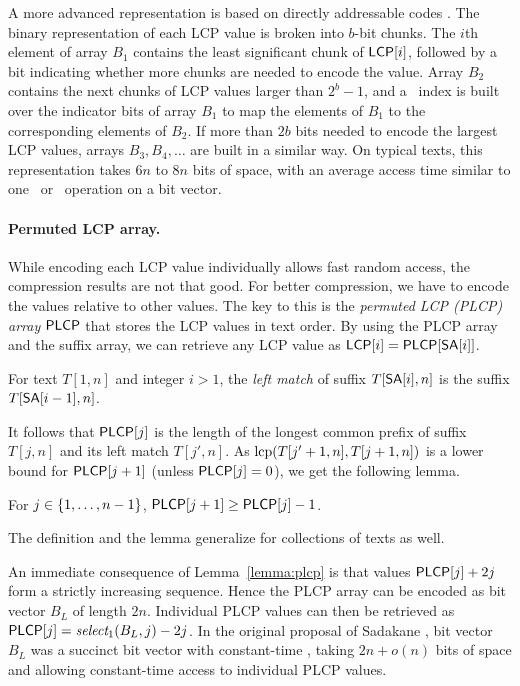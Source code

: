 A more advanced representation \cite{Canovas2010} is based on directly addressable codes \cite{Brisaboa2009}. The binary representation of each LCP value is broken into $b$\nobreakdash-bit chunks. The $i$th element of array $B_{1}$ contains the least significant chunk of $\mathsf{LCP}[i]$, followed by a bit indicating whether more chunks are needed to encode the value. Array $B_{2}$ contains the next chunks of LCP values larger than $2^{b}-1$, and a \rank\ index is built over the indicator bits of array $B_{1}$ to map the elements of $B_{1}$ to the corresponding elements of $B_{2}$. If more than $2b$ bits needed to encode the largest LCP values, arrays $B_{3}, B_{4}, \dotsc$ are built in a similar way. On typical texts, this representation takes $6n$ to $8n$ bits of space, with an average access time similar to one \rank\ or \select\ operation on a bit vector.

\paragraph{Permuted LCP array.}

While encoding each LCP value individually allows fast random access, the compression results are not that good. For better compression, we have to encode the values relative to other values. The key to this is the \emph{permuted LCP (PLCP) array} $\mathsf{PLCP}$ that stores the LCP values in text order. By using the PLCP array and the suffix array, we can retrieve any LCP value as $\mathsf{LCP}[i] = \mathsf{PLCP}[\mathsf{SA}[i]]$.

\begin{definition}\label{def:left match}
For text $T[1,n]$ and integer $i > 1$, the \emph{left match} of suffix $T[\mathsf{SA}[i],n]$ is the suffix $T[\mathsf{SA}[i-1],n]$.
\end{definition}

It follows that $\mathsf{PLCP}[j]$ is the length of the longest common prefix of suffix $T[j,n]$ and its left match $T[j',n]$. As $\operatorname{lcp}(T[j'+1,n], T[j+1,n])$ is a lower bound for $\mathsf{PLCP}[j+1]$ (unless $\mathsf{PLCP}[j] = 0$), we get the following lemma.

\begin{lemma}\label{lemma:plcp}
For $j \in \{ 1, \dotsc, n-1 \}$, $\mathsf{PLCP}[j+1] \ge \mathsf{PLCP}[j] - 1$.
\end{lemma}

The definition and the lemma generalize for collections of texts as well.

An immediate consequence of Lemma~\ref{lemma:plcp} is that values $\mathsf{PLCP}[j] + 2j$ form a strictly increasing sequence. Hence the PLCP array can be encoded as bit vector $B_{L}$ of length $2n$. Individual PLCP values can then be retrieved as $\mathsf{PLCP}[j] = \emph{select}_{1}(B_{L}, j) - 2j$. In the original proposal of Sadakane \cite{Sadakane2007}, bit vector $B_{L}$ was  a succinct bit vector with constant-time \select, taking $2n + o(n)$ bits of space and allowing constant-time access to individual PLCP values.

